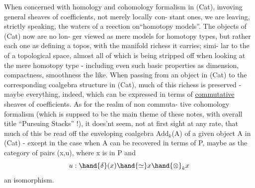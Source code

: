 When concerned with homology and cohomology formalism in (Cat),
invoving general sheaves of coefficients, not merely locally con-%
stant ones, we are leaving, strictly speaking, the waters of a
reection on``homotopy models''. The objects of (Cat) now are no lon-%
ger viewed as mere models  for homotopy types, but rather\unsure{,}  each
one as defining a topos, with the manifold richess it carries;  simi-%
lar to the   of a topological space, almost all of which is
being stripped off when looking at the mere homotopy type - including
even such basic properties as dimension, compactness, smoothness\hand{,} 
 the like. When passing from an object in (Cat) to the corresponding
 coalgebra structure in (Cat), much of this richess is preserved
- maybe everything, indeed, which  can be expressed in terms of
\uline{commutative} sheaves of coefficients. As for the realm of non commuta-%
tive cohomology formalism (which is suppsed to be the main theme of
these notes, with overall title ``Pursuing Stacks'' !), it does'nt 
seem, not at first sight at any rate, that much of this  be read
off the enveloping coalgebra  Add$_k$(A) of a given object A in (Cat) -
except\unsure{,}   in the case  when A can be recovered in terms
of P, maybe as the category of  pairs (x,u), where x is in P and
\[ u : \hand{\delta}(x) \hand{\simeq} x \hand{\otimes}_k x \]
an isomorphism.


